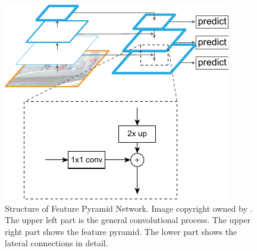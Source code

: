 \begin{figure}[!h]
	\centering
	\includegraphics[width=\figfi\textwidth]{3-12.pdf}
    \caption[Structure of Feature Pyramid Network]{Structure of Feature Pyramid Network. Image copyright owned by \cite{fpn}. The upper left part is the general convolutional process. The upper right part shows the feature pyramid. The lower part shows the lateral connections in detail.}
    \label{fig:fpn}
\end{figure}
